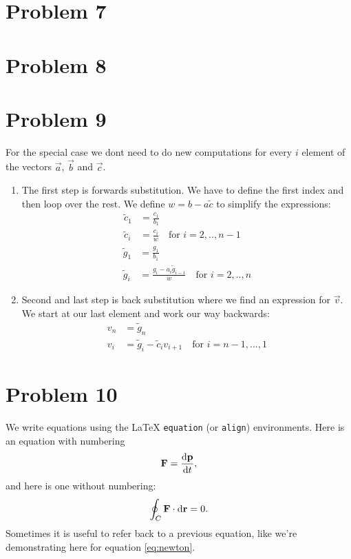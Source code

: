 \documentclass[english,notitlepage]{revtex4-1}  %
\begin{document}
\section*{Problem 7}

\section*{Problem 8}

\section*{Problem 9}
  For the special case we dont need to do new computations for every $i$ element of the vectors $\vec{a}$, $\vec{b}$ and $\vec{c}$.
\begin{enumerate}[label=\roman*)]
  \item The first step is forwards substitution. We have to define the first index and then loop over the rest. We define $w = b - a \tilde{c}$ to simplify the expressions:
  \begin{align*}
    \tilde{c}_1 &= \frac{c_1}{b_1} \\
    \tilde{c}_i &= \frac{c_i}{w} \quad  \text{for }i=2,..,n-1 \quad
  \end{align*}
  \begin{align*}
    \tilde{g}_1 &= \frac{g_1}{b_1} \\
    \tilde{g}_i &= \frac{g_i - a_i \tilde{g}_{i-1}}{w} \quad \text{for }i=2,..,n
  \end{align*}
  \item Second and last step is back substitution where we find an expression for $\vec{v}$. We start at our last element and work our way backwards:
  \begin{align*}
    v_n &= \tilde{g}_n \\
    v_i &= \tilde{g}_i - \tilde{c}_i v_ {i+1} \quad \text{for } i = n-1,...,1
  \end{align*}
\end{enumerate}

\section*{Problem 10}
We write equations using the LaTeX \texttt{equation} (or \texttt{align}) environments. Here is an equation with numbering
\begin{equation}\label{eq:newton}
  \vb{F} = \dv{\vb{p}}{t},
\end{equation}
and here is one without numbering:
\begin{equation*}
\oint_C \vb{F}\cdot \dd \vb{r} = 0.
\end{equation*}
Sometimes it is useful to refer back to a previous equation, like we're demonstrating here for equation \ref{eq:newton}.
\end{document}

